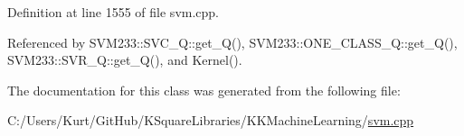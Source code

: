 Definition at line 1555 of file svm.\+cpp.



Referenced by S\+V\+M233\+::\+S\+V\+C\+\_\+\+Q\+::get\+\_\+\+Q(), S\+V\+M233\+::\+O\+N\+E\+\_\+\+C\+L\+A\+S\+S\+\_\+\+Q\+::get\+\_\+\+Q(), S\+V\+M233\+::\+S\+V\+R\+\_\+\+Q\+::get\+\_\+\+Q(), and Kernel().



The documentation for this class was generated from the following file\+:\begin{DoxyCompactItemize}
\item 
C\+:/\+Users/\+Kurt/\+Git\+Hub/\+K\+Square\+Libraries/\+K\+K\+Machine\+Learning/\hyperlink{svm_8cpp}{svm.\+cpp}\end{DoxyCompactItemize}
